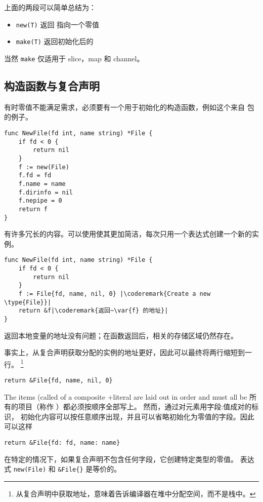 \begin{lbar}
上面的两段可以简单总结为：
\begin{itemize}
\item \lstinline{new(T)} 返回  指向一个零值 
\item \lstinline{make(T)} 返回初始化后的 
\end{itemize}
当然 \lstinline{make} 仅适用于 slice，map 和 channel。
\end{lbar}

\subsection{构造函数与复合声明}
\label{sec:constructors and composite literals}
有时零值不能满足需求，必须要有一个用于初始化的构造函数，例如这个来自
 包的例子。
\begin{lstlisting}
func NewFile(fd int, name string) *File {
    if fd < 0 {
        return nil
    }
    f := new(File)
    f.fd = fd
    f.name = name
    f.dirinfo = nil
    f.nepipe = 0
    return f
}
\end{lstlisting}
有许多冗长的内容。可以使用使其更加简洁，每次只用一个表达式创建一个新的实例。

\begin{lstlisting}
func NewFile(fd int, name string) *File {
    if fd < 0 {
        return nil
    }
    f := File{fd, name, nil, 0}	|\coderemark{Create a new \type{File}}|
    return &f|\coderemark{返回~\var{f} 的地址}|
}
\end{lstlisting}
返回本地变量的地址没有问题；在函数返回后，相关的存储区域仍然存在。

事实上，从复合声明获取分配的实例的地址更好，因此可以最终将两行缩短到一行。
\footnote{从复合声明中获取地址，意味着告诉编译器在堆中分配空间，而不是栈中。}
\begin{lstlisting}
return &File{fd, name, nil, 0}
\end{lstlisting}
The items (called  of a composite 
+literal are laid out in order and must all be
所有的项目（称作 ）都必须按顺序全部写上。
然而，通过对元素用字段:值成对的标识，
初始化内容可以按任意顺序出现，并且可以省略初始化为零值的字段。因此可以这样

\begin{lstlisting}
return &File{fd: fd, name: name}
\end{lstlisting}
在特定的情况下，如果复合声明不包含任何字段，它创建特定类型的零值。
表达式 \lstinline{new(File)} 和 \lstinline|&File{}| 是等价的。

